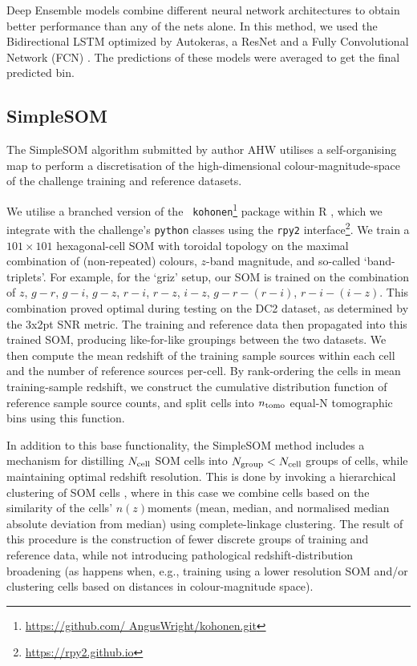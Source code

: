 \documentclass[twocolumn,twocolappendix]{aastex63}
\begin{document}
Deep Ensemble models combine different neural network architectures to obtain better performance
than any of the nets alone. In this method, we used the Bidirectional LSTM optimized by Autokeras, a
ResNet \citep{resnet} and a Fully Convolutional Network (FCN) \citep{fcn}. The predictions of these
models were averaged to get the final predicted bin. 
 


\subsection{ {\sc SimpleSOM} }
The SimpleSOM algorithm submitted by author AHW utilises a self-organising map
\citep[SOM,][]{Kohonen:1982} to perform  a discretisation of the
high-dimensional colour-magnitude-space of the challenge training and reference
datasets. 

We utilise a branched version of the {\tt
kohonen}\footnote{\url{https://github.com/ AngusWright/kohonen.git}} package
\citep{Wright/etal:2020b, Wehrens/Kruisselbrink:2018, Wehrens/Lutgarde:2007}
within R \citep{R}, which we integrate with  the challenge's {\tt python}
classes using the {\tt rpy2} interface\footnote{\url{https://rpy2.github.io}}. 
We train a $101 \times 101$ hexagonal-cell SOM with toroidal topology on the
maximal combination of (non-repeated) colours, $z$-band magnitude, and so-called
`band-triplets'. For example, for the `griz' setup, our SOM is trained on the
combination of  $z$, $g-r$, $g-i$, $g-z$, $r-i$, $r-z$, $i-z$, $g-r-(r-i)$,
$r-i-(i-z)$. This combination proved optimal during testing on the DC2 dataset,
as determined by the 3x2pt SNR metric. The training and reference data then
propagated into this trained SOM, producing like-for-like groupings between the
two datasets. We then compute the mean redshift of the training sample sources
within each cell and the number of reference sources per-cell. By rank-ordering
the cells in mean training-sample redshift, we construct the cumulative
distribution function of reference sample source counts, and split cells into
${n_{\rm tomo}}$ equal-N tomographic bins using this function. 

In addition to this base functionality, the SimpleSOM method includes a
mechanism for distilling $N_{\rm cell}$ SOM cells into $N_{\rm group}<N_{\rm
cell}$ groups of cells, while maintaining optimal redshift resolution. This is
done by invoking a hierarchical clustering of SOM cells \citep[see Appendix B of
][]{Wright/etal:2020a}, where in this case we combine cells based on the
similarity of the cells' $n(z) $moments (mean, median, and normalised median absolute
deviation from median) using complete-linkage clustering. The result of this
procedure is the construction of fewer discrete groups of training and reference
data, while not introducing pathological redshift-distribution broadening (as
happens when, e.g., training using a lower resolution SOM and/or clustering
cells based on distances in colour-magnitude space). 
\end{document}
